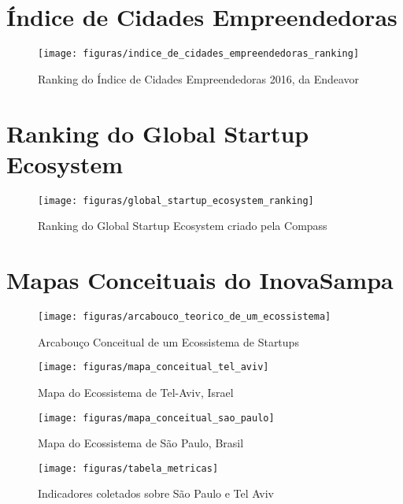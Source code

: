 \begin{anexosenv}

\partanexos

\chapter{Índice de Cidades Empreendedoras}
\label{anexo:indice_de_cidades_empreendedoras}

\begin{figure}[!htb]
\centering
\texttt{[image: figuras/indice\_de\_cidades\_empreendedoras\_ranking]}
\caption{Ranking do Índice de Cidades Empreendedoras 2016, da Endeavor}
\label{figure:indice_de_cidades_empreendedoras_ranking}
\end{figure}

\chapter{Ranking do Global Startup Ecosystem}
\label{anexo:ranking_do_global_startup_ecosystem}

\begin{figure}[!htb]
\centering
\texttt{[image: figuras/global\_startup\_ecosystem\_ranking]}
\caption{Ranking do Global Startup Ecosystem criado pela Compass}
\label{figure:global_startup_ecosystem_ranking}
\end{figure}

\chapter{Mapas Conceituais do InovaSampa}
\label{anexo:mapas_concentuais_do_inovasampa}

\begin{figure}[!htb]
	\centering
	\texttt{[image: figuras/arcabouco\_teorico\_de\_um\_ecossistema]}
	\caption{Arcabouço Conceitual de um Ecossistema de Startups}
	\label{figure:arcabouco_teorico_de_um_ecossistema}
\end{figure}

\begin{figure}[!htbp]
	\centering
	\texttt{[image: figuras/mapa\_conceitual\_tel\_aviv]}
	\caption{Mapa do Ecossistema de Tel-Aviv, Israel}
	\label{figure:mapa_conceitual_tel_aviv}
\end{figure}

\begin{figure}[!htbp]
	\centering
	\texttt{[image: figuras/mapa\_conceitual\_sao\_paulo]}
	\caption{Mapa do Ecossistema de São Paulo, Brasil}
	\label{figure:mapa_conceitual_sao_paulo}
\end{figure}

\begin{figure}[!htb]
	\centering
	\texttt{[image: figuras/tabela\_metricas]}
	\caption{Indicadores coletados sobre São Paulo e Tel Aviv}
	\label{figure:tabela_metricas}
\end{figure}

\end{anexosenv}

